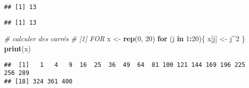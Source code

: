 \documentclass[]{book}
\newenvironment{Shaded}{\begin{snugshade}}{\end{snugshade}}
\newcommand{\KeywordTok}[1]{\textcolor[rgb]{0.13,0.29,0.53}{\textbf{#1}}}
\newcommand{\DataTypeTok}[1]{\textcolor[rgb]{0.13,0.29,0.53}{#1}}
\newcommand{\DecValTok}[1]{\textcolor[rgb]{0.00,0.00,0.81}{#1}}
\newcommand{\StringTok}[1]{\textcolor[rgb]{0.31,0.60,0.02}{#1}}
\newcommand{\CommentTok}[1]{\textcolor[rgb]{0.56,0.35,0.01}{\textit{#1}}}
\newcommand{\ControlFlowTok}[1]{\textcolor[rgb]{0.13,0.29,0.53}{\textbf{#1}}}
\newcommand{\OperatorTok}[1]{\textcolor[rgb]{0.81,0.36,0.00}{\textbf{#1}}}
\newcommand{\NormalTok}[1]{#1}
\theoremstyle{definition}
\theoremstyle{definition}
\theoremstyle{definition}
\theoremstyle{remark}
\begin{document}
\begin{Shaded}
\end{Shaded}

\begin{verbatim}
## [1] 13
\end{verbatim}

\begin{Shaded}
\end{Shaded}

\begin{verbatim}
## [1] 13
\end{verbatim}

\begin{Shaded}
\begin{Highlighting}[]
\CommentTok{# calculer des carrés}
\CommentTok{# [1] FOR}
\NormalTok{x <-}\StringTok{ }\KeywordTok{rep}\NormalTok{(}\DecValTok{0}\NormalTok{, }\DecValTok{20}\NormalTok{)}
\ControlFlowTok{for}\NormalTok{ (j }\ControlFlowTok{in} \DecValTok{1}\OperatorTok{:}\DecValTok{20}\NormalTok{)\{}
\NormalTok{  x[j] <-}\StringTok{ }\NormalTok{j}\OperatorTok{^}\DecValTok{2}
\NormalTok{\}}
\KeywordTok{print}\NormalTok{(x)}
\end{Highlighting}
\end{Shaded}

\begin{verbatim}
##  [1]   1   4   9  16  25  36  49  64  81 100 121 144 169 196 225 256 289
## [18] 324 361 400
\end{verbatim}
\end{document}
